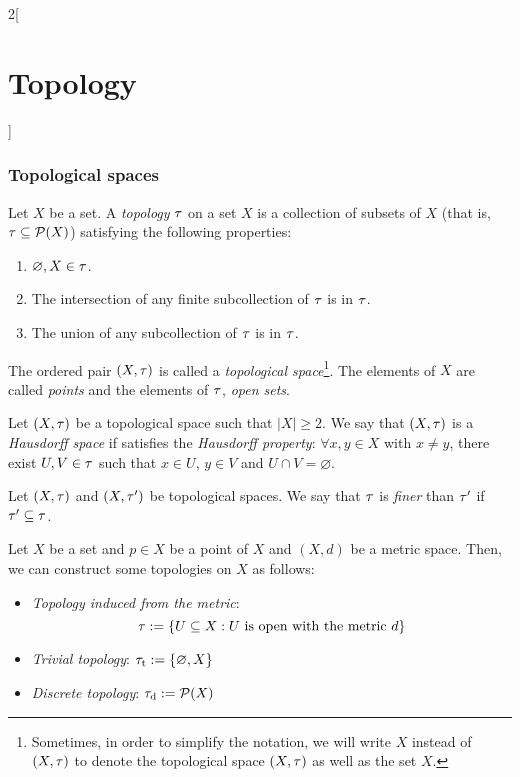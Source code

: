 \documentclass[../../../main.tex]{subfiles}
\begin{document}
\begin{multicols}{2}[\section{Topology}]
    \subsubsection{Topological spaces}
    \begin{definition}
        Let $X$ be a set. A \emph{topology} $\tau$ on a set $X$ is a collection of subsets of $X$ (that is, $\tau\subseteq\mathcal{P}(X)$) satisfying the following properties:
        \begin{enumerate}
            \item $\varnothing, X\in\tau$.
            \item The intersection of any finite subcollection of $\tau$ is in $\tau$.
            \item The union of any subcollection of $\tau$ is in $\tau$.
        \end{enumerate}
        The ordered pair $(X,\tau)$ is called a \emph{topological space}\footnote{Sometimes, in order to simplify the notation, we will write $X$ instead of $(X,\tau)$ to denote the topological space $(X,\tau)$ as well as the set $X$.}. The elements of $X$ are called \emph{points} and the elements of $\tau$, \emph{open sets}.
    \end{definition}
    \begin{definition}
        Let $(X,\tau)$ be a topological space such that $|X|\geq 2$. We say that $(X,\tau)$ is a \emph{Hausdorff space} if satisfies the \emph{Hausdorff property}: $\forall x,y\in X$ with $x\ne y$, there exist $U,V\in\tau$ such that $x\in U$, $y\in V$ and $U\cap V=\varnothing$.
    \end{definition}
    \begin{definition}
        Let $(X,\tau)$ and $(X,\tau')$ be topological spaces. We say that $\tau$ is \emph{finer} than $\tau'$ if $\tau'\subseteq\tau$.
    \end{definition}
    \begin{prop}
        Let $X$ be a set and $p\in X$ be a point of $X$ and $(X,d)$ be a metric space. Then, we can construct some topologies on $X$ as follows:
        \begin{itemize}
            \item \emph{Topology induced from the metric}: $$\tau:=\{U\subseteq X:U\text{ is open with the metric }d\}$$
            \item \emph{Trivial topology}: $\tau_\text{t}:=\{\varnothing,X\}$
            \item \emph{Discrete topology}: $\tau_\text{d}:=\mathcal{P}(X)$

\end{itemize}
\end{prop}
\end{multicols}
\end{document}
